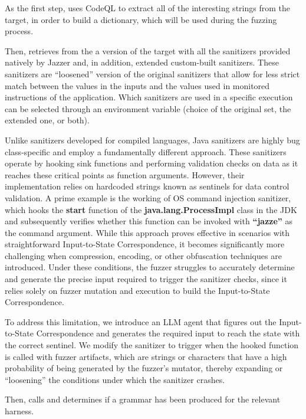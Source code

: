 As the first step, \jazzmine uses CodeQL to extract all of the interesting strings from the target, in order to build a dictionary, which will be used during the fuzzing process.

Then, \jazzmine retrieves from the \builder a version of the target with all the sanitizers provided natively by Jazzer and, in addition, extended custom-built sanitizers.
These sanitizers are ``loosened'' version of the original sanitizers that allow for less strict match between the values in the inputs and the values used in monitored instructions of the application.
Which sanitizers are used in a specific execution can be selected through an environment variable (choice of the original set, the extended one, or both).

Unlike sanitizers developed for compiled languages, Java sanitizers are highly bug class-specific and employ a fundamentally different approach. These sanitizers operate by hooking sink functions and performing validation checks on data as it reaches these critical points as function arguments. However, their implementation relies on hardcoded strings known as sentinels for data control validation. A prime example is the working of OS command injection sanitizer, which hooks the \textbf{start} function of the \textbf{java.lang.ProcessImpl} class in the JDK and subsequently verifies whether this function can be invoked with \textbf{``jazze''} as the command argument. While this approach proves effective in scenarios with straightforward Input-to-State Correspondence, it becomes significantly more challenging when compression, encoding, or other obfuscation techniques are introduced. Under these conditions, the fuzzer struggles to accurately determine and generate the precise input required to trigger the sanitizer checks, since it relies solely on fuzzer mutation and execution to build the Input-to-State Correspondence.

To address this limitation, we introduce an LLM agent that figures out the Input-to-State Correspondence and generates the required input to reach the state with the correct sentinel.  We modify the sanitizer to trigger when the hooked function is called with fuzzer artifacts, which are strings or characters that have a high probability of being generated by the fuzzer's mutator, thereby expanding or ``loosening'' the conditions under which the sanitizer crashes.

Then, \jazzmine calls \grammarguy and determines if a grammar has been produced for the relevant harness.

